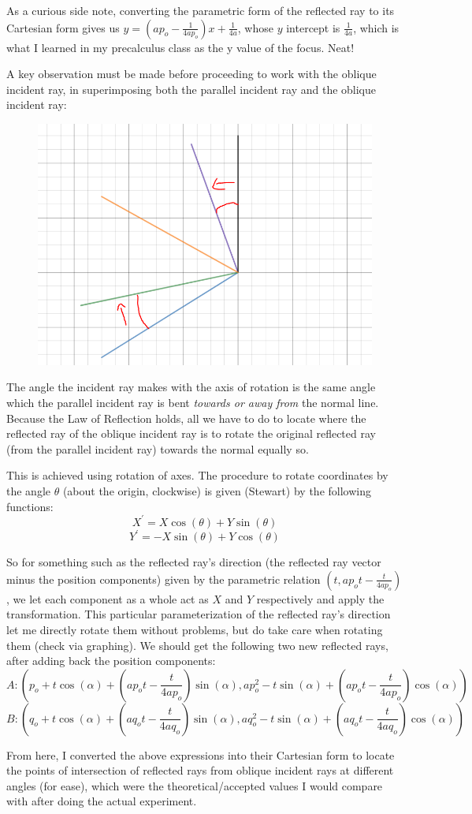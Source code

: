 \documentclass[10pt]{article}
\begin{document}
 As a curious side note, converting the parametric form of the reflected ray to its Cartesian form gives us $y=\left(ap_{o}-\frac{1}{4ap_{o}}\right)x+\frac{1}{4a}$, whose $y$ intercept is $\frac{1}{4a}$, which is what I learned in my precalculus class as the y value of the focus. Neat!

A key observation must be made before proceeding to work with the oblique incident ray, in superimposing both the parallel incident ray and the oblique incident ray:


\begin{figure}[h]
\centering{}
\includegraphics[scale=0.3]{vec2}
\end{figure}

The angle the incident ray makes with the axis of rotation is the same angle which the parallel incident ray is bent \textit{towards or away from} the normal line. Because the Law of Reflection holds, all we have to do to locate where the reflected ray of the oblique incident ray is to rotate the original reflected ray (from the parallel incident ray) towards the normal equally so. 

This is achieved using rotation of axes. The procedure to rotate coordinates by the angle $\theta$ (about the origin, clockwise) is given (Stewart) by the following functions:
$$X^{\prime} = X\cos(\theta)+Y\sin(\theta)$$
$$Y^{\prime} = -X\sin(\theta)+Y\cos(\theta)$$

So for something such as the reflected ray's direction (the reflected ray vector minus the position components) given by the parametric relation $\left(t,ap_{o}t-\frac{t}{4ap_{o}}\right)$, we let each component as a whole act as $X$ and $Y$ respectively and apply the transformation. This particular parameterization of the reflected ray's direction let me directly rotate them without problems, but do take care when rotating them (check via graphing). We should get the following two new reflected rays, after adding back the position components:
$$A:\left(p_{o}+t\cos\left(\alpha\right)+\left(ap_{o}t-\frac{t}{4ap_{o}}\right)\sin\left(\alpha\right),ap_{o}^{2}-t\sin\left(\alpha\right)+\left(ap_{o}t-\frac{t}{4ap_{o}}\right)\cos\left(\alpha\right)\right)$$
$$B:\left(q_{o}+t\cos\left(\alpha\right)+\left(aq_{o}t-\frac{t}{4aq_{o}}\right)\sin\left(\alpha\right),aq_{o}^{2}-t\sin\left(\alpha\right)+\left(aq_{o}t-\frac{t}{4aq_{o}}\right)\cos\left(\alpha\right)\right)$$

From here, I converted the above expressions into their Cartesian form to locate the points of intersection of reflected rays from oblique incident rays at different angles (for ease), which were the theoretical/accepted values I would compare with after doing the actual experiment.
\end{document}
